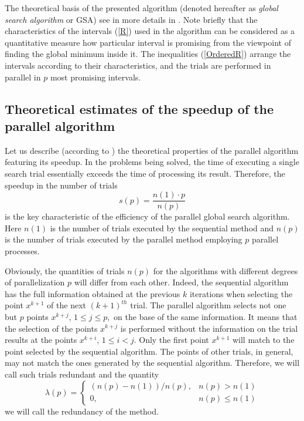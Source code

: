 \documentclass[runningheads]{llncs}
\begin{document}
The theoretical basis of the presented algorithm (denoted hereafter as \textit{global search algorithm} or GSA) see in more details in \cite{Strongin2000}. Note briefly that the characteristics of the intervals (\ref{R}) used in the algorithm can be considered as a quantitative measure how particular interval is promising from the viewpoint of finding the global minimum inside it. The inequalities (\ref{OrderedR}) arrange the intervals according to their characteristics, and the trials are performed in parallel in $p$ most promising intervals.

\subsection{Theoretical estimates of the speedup of the parallel algorithm}

Let us describe (according to \cite{Strongin2000}) the theoretical properties of the parallel algorithm featuring its speedup. In the problems being solved, the time of executing a single search trial essentially exceeds the time of processing its result. Therefore, the speedup in the number of trials 
\begin{equation} \label{par_trl_ref}
s(p) = \frac{n(1) \cdot p}{n(p)}
\end{equation}
is the key characteristic of the efficiency of the parallel global search algorithm.
Here $n(1)$ is the number of trials executed by the sequential method and $n(p)$ is the number of trials executed by the parallel method employing $p$ parallel processes.

Obviously, the quantities of trials $n(p)$ for the algorithms with different degrees of parallelization $p$ will differ from each other. Indeed, the sequential algorithm has the full information obtained at the previous $k$ iterations when selecting the point $x^{k+1}$ of the next $(k+1)^{th}$ trial. The parallel algorithm selects not one but $p$ points $x^{k+j}$, $1 \leq j \leq p,$ on the base of the same information. It means that the selection of the points $x^{k+j}$ is performed without the information on the trial results at the points $x^{k+i}$, $1 \leq i < j$. Only the first point $x^{k+1}$ will match to the point selected by the sequential algorithm. The points of other trials, in general, may not match the ones generated by the sequential algorithm. Therefore, we will call such trials redundant and the quantity
\begin{displaymath}
\lambda(p) = \left\{ \begin{array}{ll}
                (n(p) - n(1)) / n(p), & \textrm{$n(p) > n(1)$}\\
                0, & \textrm{$n(p) \leq n(1)$}
  \end{array} \right.
\end{displaymath}
we will call the redundancy of the method.
\end{document}
